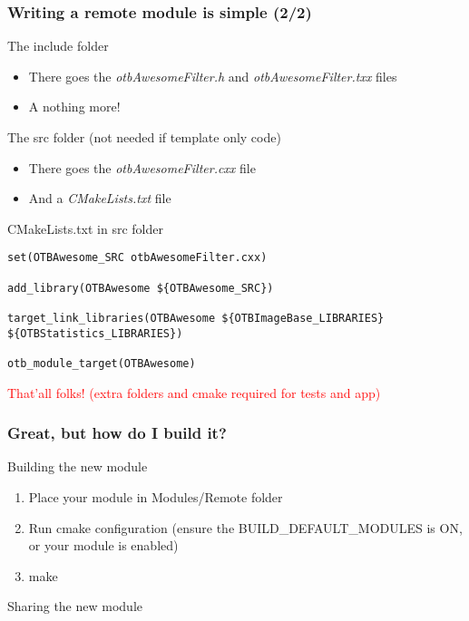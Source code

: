 \documentclass[8pt]{beamer}
\begin{document}
\begin{frame}[fragile]
\frametitle{Writing a remote module is simple (2/2)}
\begin{block}{The include folder}
\begin{itemize}
\item There goes the \textit{otbAwesomeFilter.h} and \textit{otbAwesomeFilter.txx} files
\item A nothing more!
\end{itemize}
\end{block}

\begin{block}{The src folder (not needed if template only code)}
\begin{itemize}
\item There goes the \textit{otbAwesomeFilter.cxx} file
\item And a \textit{CMakeLists.txt} file
\end{itemize}
\end{block}


\begin{block}{CMakeLists.txt in src folder}
\begin{small}
\begin{verbatim}
set(OTBAwesome_SRC otbAwesomeFilter.cxx)

add_library(OTBAwesome ${OTBAwesome_SRC})

target_link_libraries(OTBAwesome ${OTBImageBase_LIBRARIES} ${OTBStatistics_LIBRARIES})

otb_module_target(OTBAwesome)
\end{verbatim}
\end{small}
\end{block}

\textcolor{red}{That'all folks! (extra folders and cmake required for tests and app)}

\end{frame}

\begin{frame}
\frametitle{Great, but how do I build it?}
\begin{block}{Building the new module}
\begin{enumerate}
\item Place your module in Modules/Remote folder
\item Run cmake configuration (ensure the BUILD\_DEFAULT\_MODULES is ON, or your module is enabled)
\item make
\end{enumerate}
\end{block}

\begin{block}{Sharing the new module}

\end{block}

\end{frame}
\end{document}
